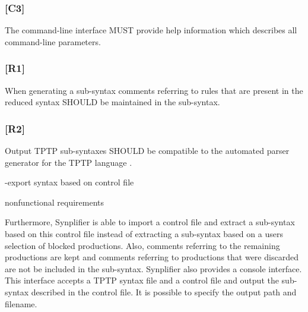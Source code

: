 \subsubsection{[C3]}\label{C3}
The command-line interface MUST provide help information which describes all command-line parameters.
\subsubsection{[R1]}\label{R1}
When generating a sub-syntax comments referring to rules that are present in the reduced syntax SHOULD be maintained in the sub-syntax.
\subsubsection{[R2]}\label{R2}
Output \ac{TPTP} sub-syntaxes SHOULD be compatible to the automated parser generator for the \ac{TPTP} language \cite{VS06}.

-export syntax based on control file

nonfunctional requirements

Furthermore, \ac{Synplifier} is able to import a control file and extract a sub-syntax based on this control file instead of extracting a sub-syntax based on a users selection of blocked productions.
Also, comments referring to the remaining productions are kept and comments referring to productions that were discarded are not be included in the sub-syntax.
\ac{Synplifier} also provides a console interface. This interface accepts a \ac{TPTP} syntax file and a control file and output the sub-syntax described in the control file. It is possible to specify the output path and filename.

